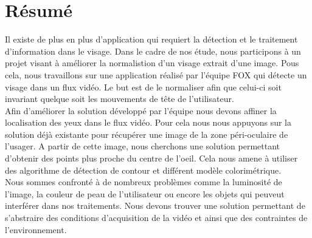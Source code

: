 \section*{Résumé}

Il existe de plus en plus d'application qui requiert la détection et le traitement d'information
dans le visage. Dans le cadre de nos étude, nous participons à un projet visant
à améliorer la normalistion d'un visage extrait d'une image. Pous cela, nous travaillons
sur une application réalisé par l'équipe FOX qui détecte un visage dans un flux vidéo. Le
but est de le normaliser afin que celui-ci soit invariant quelque soit les mouvements de tête de l'utilisateur.\\

Afin d'améliorer la solution développé par l'équipe nous devons affiner la localisation des yeux dans le flux vidéo.
Pour cela nous nous appuyons sur la solution déjà existante pour récupérer une image de 
la zone péri-oculaire de l'usager. A partir de cette image, nous cherchons une
solution permettant d'obtenir des points plus proche du centre de l'oeil. Cela nous amene 
à utiliser des algorithme de détection de contour et différent modèle colorimétrique.\\

Nous sommes confronté à de nombreux problèmes comme la luminosité de l'image, la couleur de 
peau de l'utilisateur ou encore les objets qui peuveut interférer dans nos traitements.
Nous devons trouver une solution permettant de s'abstraire des conditions d'acquisition
de la vidéo et ainsi que des contraintes de l'environnement.


\newpage